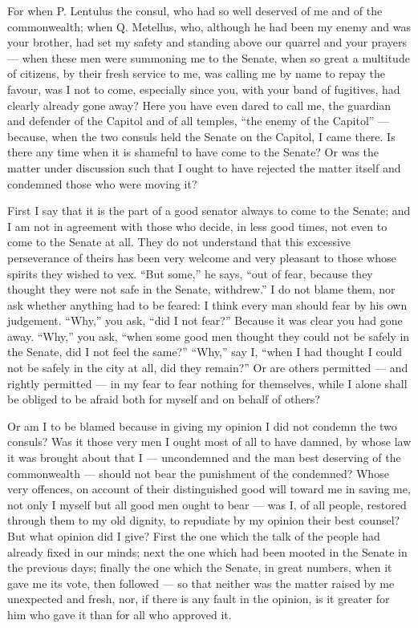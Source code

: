  For when P. Lentulus the consul, who had so well deserved of me and of the commonwealth; when Q. Metellus, who, although he had been my enemy and was your brother, had set my safety and standing above our quarrel and your prayers --- when these men were summoning me to the Senate, when so great a multitude of citizens, by their fresh service to me, was calling me by name to repay the favour, was I not to come, especially since you, with your band of fugitives, had clearly already gone away? Here you have even dared to call me, the guardian and defender of the Capitol and of all temples, ``the enemy of the Capitol'' --- because, when the two consuls held the Senate on the Capitol, I came there. Is there any time when it is shameful to have come to the Senate? Or was the matter under discussion such that I ought to have rejected the matter itself and condemned those who were moving it?

 First I say that it is the part of a good senator always to come to the Senate; and I am not in agreement with those who decide, in less good times, not even to come to the Senate at all. They do not understand that this excessive perseverance of theirs has been very welcome and very pleasant to those whose spirits they wished to vex. ``But some,'' he says, ``out of fear, because they thought they were not safe in the Senate, withdrew.'' I do not blame them, nor ask whether anything had to be feared: I think every man should fear by his own judgement. ``Why,'' you ask, ``did I not fear?'' Because it was clear you had gone away. ``Why,'' you ask, ``when some good men thought they could not be safely in the Senate, did I not feel the same?'' ``Why,'' say I, ``when I had thought I could not be safely in the city at all, did they remain?'' Or are others permitted --- and rightly permitted --- in my fear to fear nothing for themselves, while I alone shall be obliged to be afraid both for myself and on behalf of others?

 Or am I to be blamed because in giving my opinion I did not condemn the two consuls? Was it those very men I ought most of all to have damned, by whose law it was brought about that I --- uncondemned and the man best deserving of the commonwealth --- should not bear the punishment of the condemned? Whose very offences, on account of their distinguished good will toward me in saving me, not only I myself but all good men ought to bear --- was I, of all people, restored through them to my old dignity, to repudiate by my opinion their best counsel? But what opinion did I give? First the one which the talk of the people had already fixed in our minds; next the one which had been mooted in the Senate in the previous days; finally the one which the Senate, in great numbers, when it gave me its vote, then followed --- so that neither was the matter raised by me unexpected and fresh, nor, if there is any fault in the opinion, is it greater for him who gave it than for all who approved it.

